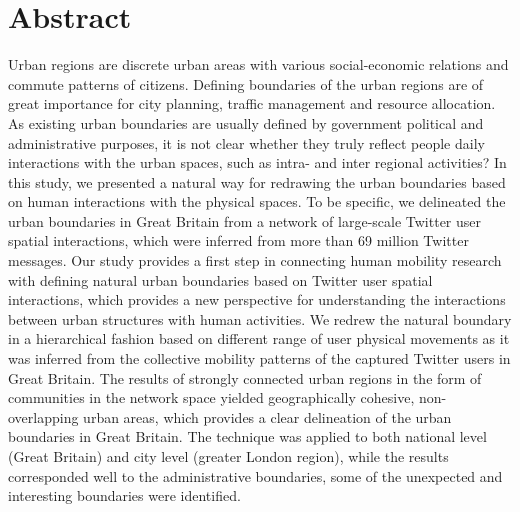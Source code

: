 \documentclass[10pt,letterpaper]{article}
\begin{document}
\section*{Abstract}
Urban regions are discrete urban areas with various social-economic relations and commute patterns of citizens.
Defining boundaries of the urban regions are of great importance for city planning, traffic management and resource allocation.
As existing urban boundaries are usually defined by government political and administrative purposes, it is not clear whether they truly reflect people daily interactions with the urban spaces, such as intra- and inter regional activities?
In this study, we presented a natural way for redrawing the urban boundaries based on human interactions with the physical spaces.
To be specific, we delineated the urban boundaries in Great Britain from a network of large-scale Twitter user spatial interactions, which were inferred from more than 69 million Twitter messages.
Our study provides a first step in connecting human mobility research with defining natural urban boundaries based on Twitter user spatial interactions, which provides a new perspective for understanding the interactions between urban structures with human activities. 
We redrew the natural boundary in a hierarchical fashion based on different range of user physical movements as it was inferred from the collective mobility patterns of the captured Twitter users in Great Britain.
The results of strongly connected urban regions in the form of communities in the network space yielded geographically cohesive, non-overlapping urban areas, which provides a clear delineation of the urban boundaries in Great Britain.
The technique was applied to both national level (Great Britain) and city level (greater London region), while the results corresponded well to the administrative boundaries, some of the unexpected and interesting boundaries were identified.

\linenumbers
\end{document}
